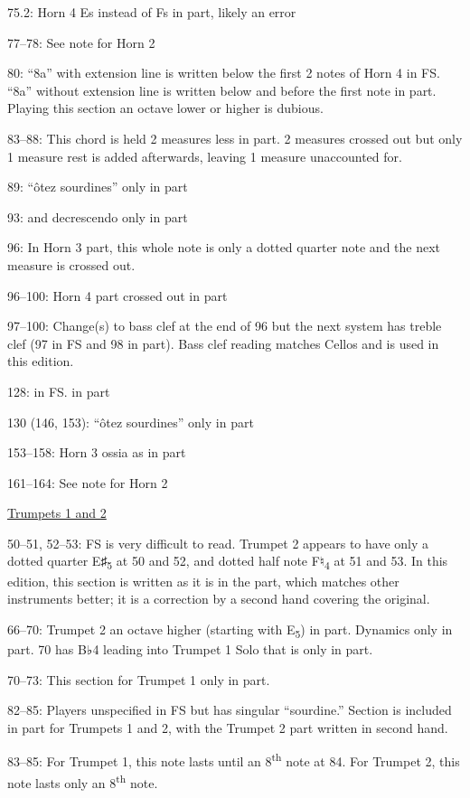 \documentclass[twoside]{article}
\newcommand\dynmark[1]{\scalebox{0.9}{#1}{\kern1pt}}
\begin{document}
\begin{hangparas}{15pt}{1}
\begin{multicols}{2}
75.2: Horn 4 Es instead of Fs in part, likely an error

77--78: See note for Horn 2

80: ``8a'' with extension line is written below the first 2 notes of Horn 4 in FS. ``8a'' without extension line is written below and before the first note in part. Playing this section an octave lower or higher is dubious.

83--88: This chord is held 2 measures less in part. 2 measures crossed out but only 1 measure rest is added afterwards, leaving 1 measure unaccounted for.

89: ``ôtez sourdines'' only in part

93: \dynmark{\sF} and decrescendo only in part

96: In Horn 3 part, this whole note is only a dotted quarter note and the next measure is crossed out.

96--100: Horn 4 part crossed out in part

97--100: Change(s) to bass clef at the end of 96 but the next system has treble clef (97 in FS and 98 in part). Bass clef reading matches Cellos and is used in this edition.

128: \dynmark{\mf} in FS. \dynmark{\ff} in part

130 (146, 153): ``ôtez sourdines'' only in part

153--158: Horn 3 ossia as in part

161--164: See note for Horn 2

\columnbreak

\underline{Trumpets 1 and 2}

50--51, 52--53: FS is very difficult to read. Trumpet 2 appears to have only a dotted quarter E♯\textsubscript{5} at 50 and 52, and dotted half note F♮\textsubscript{4} at 51 and 53. In this edition, this section is written as it is in the part, which matches other instruments better; it is a correction by a second hand covering the original.

66--70: Trumpet 2 an octave higher (starting with E\textsubscript{5}) in part. Dynamics only in part. 70 has B♭4 leading into Trumpet 1 Solo that is only in part.

70--73: This section for Trumpet 1 only in part.

82--85: Players unspecified in FS but has singular ``sourdine.'' Section is included in part for Trumpets 1 and 2, with the Trumpet 2 part written in second hand.

83--85: For Trumpet 1, this note lasts until an 8\textsuperscript{th} note at 84. For Trumpet 2, this note lasts only an 8\textsuperscript{th} note.


\end{multicols}
\end{hangparas}
\end{document}
